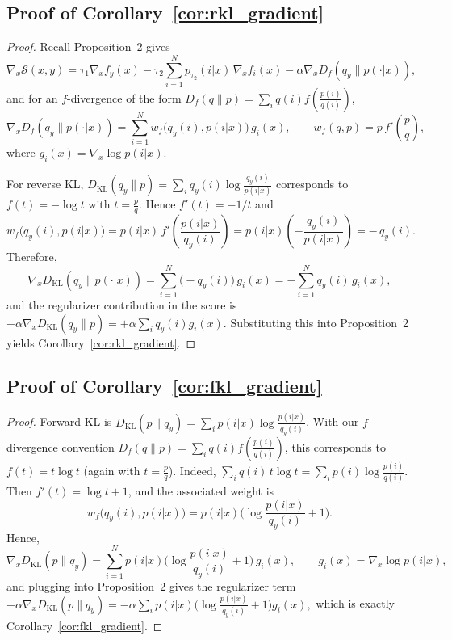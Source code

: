 \documentclass{article}
\begin{document}
\subsection{Proof of Corollary~\ref{cor:rkl_gradient}}
\label{app:proof_rkl}
\begin{proof}
Recall Proposition~2 gives
\begin{equation}
\nabla_x \mathcal{S}(x,y)
=
\tau_1 \nabla_x f_y(x)
-\tau_2 \sum_{i=1}^N p_{\tau_2}(i|x)\,\nabla_x f_i(x)
-\alpha \nabla_x D_f(q_y\|p(\cdot|x)),
\end{equation}
and for an $f$-divergence of the form $D_f(q\|p)=\sum_i q(i) f\!\left(\frac{p(i)}{q(i)}\right)$,
\begin{equation}
\nabla_x D_f(q_y\|p(\cdot|x))=\sum_{i=1}^N w_f\big(q_y(i),p(i|x)\big)\, g_i(x),
\qquad
w_f(q,p)=p\, f'\!\left(\frac{p}{q}\right),
\end{equation}
where $g_i(x)=\nabla_x \log p(i|x)$.

For reverse KL, $D_{\mathrm{KL}}(q_y\|p)=\sum_i q_y(i)\log\frac{q_y(i)}{p(i|x)}$
corresponds to $f(t)=-\log t$ with $t=\frac{p}{q}$. Hence $f'(t)=-1/t$ and
\begin{equation}
w_f\big(q_y(i),p(i|x)\big)
=
p(i|x)\, f'\!\left(\frac{p(i|x)}{q_y(i)}\right)
=
p(i|x)\left(-\frac{q_y(i)}{p(i|x)}\right)
=
-\,q_y(i).
\end{equation}
Therefore,
\begin{equation}
\nabla_x D_{\mathrm{KL}}(q_y\|p(\cdot|x))
=
\sum_{i=1}^N \big(-q_y(i)\big)\, g_i(x)
=
-\sum_{i=1}^N q_y(i)\, g_i(x),
\end{equation}
and the regularizer contribution in the score is
\(
-\alpha \nabla_x D_{\mathrm{KL}}(q_y\|p)=+\alpha \sum_i q_y(i) g_i(x).
\)
Substituting this into Proposition~2 yields Corollary~\ref{cor:rkl_gradient}.
\end{proof}


\subsection{Proof of Corollary~\ref{cor:fkl_gradient}}
\label{app:proof_fkl}
\begin{proof}
Forward KL is $D_{\mathrm{KL}}(p\|q_y)=\sum_i p(i|x)\log\frac{p(i|x)}{q_y(i)}$.
With our $f$-divergence convention $D_f(q\|p)=\sum_i q(i) f\!\left(\frac{p(i)}{q(i)}\right)$,
this corresponds to $f(t)=t\log t$ (again with $t=\frac{p}{q}$). Indeed,
\(
\sum_i q(i)\, t\log t = \sum_i p(i)\log\frac{p(i)}{q(i)}.
\)
Then $f'(t)=\log t + 1$, and the associated weight is
\begin{equation}
w_f\big(q_y(i),p(i|x)\big)
=
p(i|x)\Big(\log\frac{p(i|x)}{q_y(i)}+1\Big).
\end{equation}
Hence,
\begin{equation}
\nabla_x D_{\mathrm{KL}}(p\|q_y)
=
\sum_{i=1}^N p(i|x)\Big(\log\frac{p(i|x)}{q_y(i)}+1\Big)\, g_i(x),
\qquad g_i(x)=\nabla_x \log p(i|x),
\end{equation}
and plugging into Proposition~2 gives the regularizer term
\(
-\alpha \nabla_x D_{\mathrm{KL}}(p\|q_y)
=
-\alpha \sum_i p(i|x)\big(\log\frac{p(i|x)}{q_y(i)}+1\big) g_i(x),
\)
which is exactly Corollary~\ref{cor:fkl_gradient}.
\end{proof}
\end{document}
